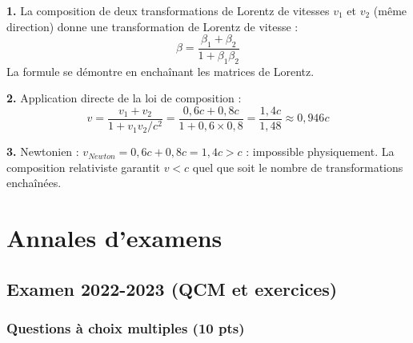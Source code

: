 \documentclass[12pt,a4paper]{article}
\begin{document}
\begin{boitecorrige}
\textbf{1.} La composition de deux transformations de Lorentz de vitesses $v_1$ et $v_2$ (même direction) donne une transformation de Lorentz de vitesse :
\[
\beta = \frac{\beta_1+\beta_2}{1+\beta_1\beta_2}
\]
La formule se démontre en enchaînant les matrices de Lorentz.

\textbf{2.} Application directe de la loi de composition :
\[
v = \frac{v_1+v_2}{1+v_1v_2/c^2} = \frac{0{,}6c+0{,}8c}{1+0{,}6\times0{,}8} = \frac{1{,}4c}{1{,}48} \approx \boxed{0{,}946c}
\]

\textbf{3.} Newtonien : $v_{Newton} = 0{,}6c + 0{,}8c = 1{,}4c > c$ : impossible physiquement. La composition relativiste garantit $v < c$ quel que soit le nombre de transformations enchaînées.
\end{boitecorrige}


\newpage
\section{Annales d'examens}

\subsection*{Examen 2022-2023 (QCM et exercices)}

\subsubsection*{Questions à choix multiples (10 pts)}
\end{document}
